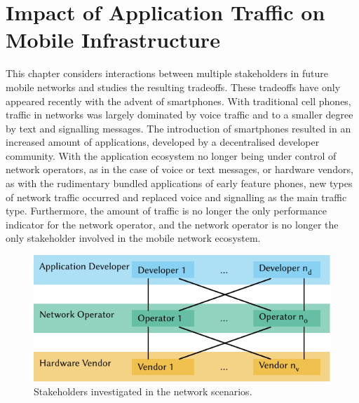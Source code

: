 \chapter{Impact of Application Traffic on Mobile Infrastructure}\label{chap:network}

\newcommand{\TFACH}{\ensuremath{T_{\text{FACH}}}\xspace}
\newcommand{\TDCH}{\ensuremath{T_{\text{DCH}}}\xspace}

This chapter considers interactions between multiple stakeholders in future mobile networks and studies the resulting tradeoffs.
These tradeoffs have only appeared recently with the advent of smartphones.
With traditional cell phones, traffic in networks was largely dominated by voice traffic and to a smaller degree by text and signalling messages.
The introduction of smartphones resulted in an increased amount of applications, developed by a decentralised developer community.
With the application ecosystem no longer being under control of network operators, as in the case of voice or text messages, or hardware vendors, as with the rudimentary bundled applications of early feature phones, new types of network traffic occurred and replaced voice and signalling as the main traffic type.
Furthermore, the amount of traffic is no longer the only performance indicator for the network operator, and the network operator is no longer the only stakeholder involved in the mobile network ecosystem.

\begin{figure}
  \centering
  \includegraphics{network/figures/stakeholders}
  \caption{Stakeholders investigated in the network scenarios.}
  \label{fig:network:stakeholders}
\end{figure}


